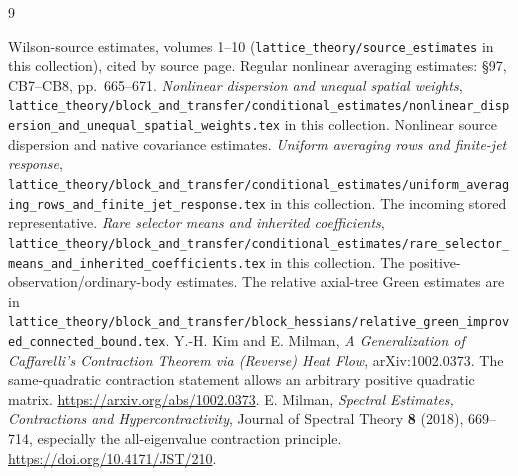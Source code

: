 \documentclass[11pt,letterpaper]{article}
\numberwithin{equation}{section}
\theoremstyle{definition}\newtheorem{definition}[theorem]{Definition}
\theoremstyle{remark}\newtheorem{remark}[theorem]{Remark}
\begin{document}
\begin{thebibliography}{9}
\raggedright
{} Wilson-source estimates, volumes 1--10 (\texttt{lattice\_theory/source\_estimates} in this collection), cited by source page. Regular nonlinear averaging estimates: \S97, CB7--CB8, pp.~665--671.
 \emph{Nonlinear dispersion and unequal spatial weights}, \texttt{lattice\_theory/block\_and\_transfer/conditional\_estimates/nonlinear\_dispersion\_and\_unequal\_spatial\_weights.tex} in this collection. Nonlinear source dispersion and native covariance estimates.
 \emph{Uniform averaging rows and finite-jet response}, \texttt{lattice\_theory/block\_and\_transfer/conditional\_estimates/uniform\_averaging\_rows\_and\_finite\_jet\_response.tex} in this collection. The incoming stored representative.
 \emph{Rare selector means and inherited coefficients}, \texttt{lattice\_theory/block\_and\_transfer/conditional\_estimates/rare\_selector\_means\_and\_inherited\_coefficients.tex} in this collection. The positive-observation/ordinary-body estimates. The relative axial-tree Green estimates are in \texttt{lattice\_theory/block\_and\_transfer/block\_hessians/relative\_green\_improved\_connected\_bound.tex}.
 Y.-H. Kim and E. Milman, \emph{A Generalization of Caffarelli's Contraction Theorem via (Reverse) Heat Flow}, arXiv:1002.0373. The same-quadratic contraction statement allows an arbitrary positive quadratic matrix. \url{https://arxiv.org/abs/1002.0373}.
 E. Milman, \emph{Spectral Estimates, Contractions and Hypercontractivity}, Journal of Spectral Theory \textbf{8} (2018), 669--714, especially the all-eigenvalue contraction principle. \url{https://doi.org/10.4171/JST/210}.
\end{thebibliography}
\end{document}
